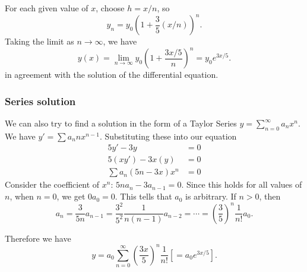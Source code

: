 \documentclass[a4paper]{article}
\begin{document}
For each given value of $x$, choose $h = x/n$, so
\[
y_n = y_0\left(1 + \frac{3}{5}(x/n)\right)^n.
\]
Taking the limit as $n\to \infty$, we have
\[
y(x) = \lim_{n\to \infty} y_0\left(1 + \frac{3x/5}{n}\right)^n = y_0 e^{3x/5}.
\]
in agreement with the solution of the differential equation.

\begin{center}
\end{center}

\subsubsection{Series solution}
We can also try to find a solution in the form of a Taylor Series $y = \sum\limits_{n=0}^\infty a_nx^n$. We have $y' = \sum a_nnx^{n-1}$. Substituting these into our equation
\begin{align*}
  5y' - 3y &= 0\\
  5(xy')  - 3x(y) &= 0\\
  \sum a_n(5n - 3x)x^n &= 0
\end{align*}
Consider the coefficient of $x^n$: $5n a_n - 3 a_{n-1} = 0$. Since this holds for all values of $n$, when $n = 0$, we get $0a_0 = 0$. This tells that $a_0$ is arbitrary. If $n>0$, then
\[
a_n = \frac{3}{5n}a_{n-1} = \frac{3^2}{5^2}\frac{1}{n(n-1)}a_{n-2} = \cdots = \left(\frac{3}{5}\right)^n \frac{1}{n!}a_0.
\]

Therefore we have
\[
y = a_0\sum_{n = 0}^\infty \left(\frac{3x}{5}\right)^n\frac{1}{n!} \left[= a_0 e^{3x/5}\right].
\]
\end{document}
